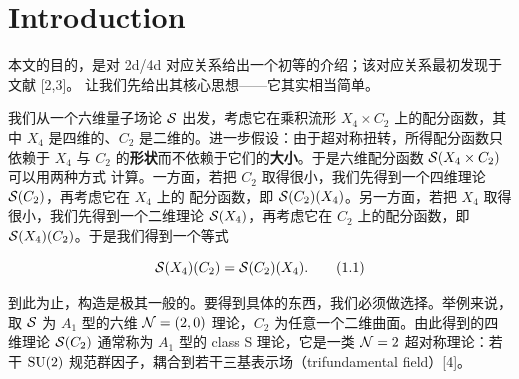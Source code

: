 
\section{Introduction}

本文的目的，是对 2d/4d 对应关系给出一个初等的介绍；该对应关系最初发现于文献 [2,3]。
让我们先给出其核心思想——它其实相当简单。


我们从一个六维量子场论 $\mathcal{S}$ 出发，考虑它在乘积流形 $X_4\times C_2$ 上的配分函数，其中
$X_4$ 是四维的、$C_2$ 是二维的。进一步假设：由于超对称扭转，所得配分函数只依赖于 $X_4$ 与
$C_2$ 的\textbf{形状}而不依赖于它们的\textbf{大小}。于是六维配分函数 $\mathcal{S}(X_4\times C_2)$ 可以用两种方式
计算。一方面，若把 $C_2$ 取得很小，我们先得到一个四维理论 $\mathcal{S}(C_2)$，再考虑它在 $X_4$ 上的
配分函数，即 $\mathcal{S}(C_2)(X_4)$。另一方面，若把 $X_4$ 取得很小，我们先得到一个二维理论
$\mathcal{S}(X_4)$，再考虑它在 $C_2$ 上的配分函数，即 $\mathcal{S}(X_4)(C_2)$。于是我们得到一个等式

\begin{equation}
  \mathcal{S}(X_4)(C_2) = \mathcal{S}(C_2)(X_4). \tag{1.1}
\end{equation}


到此为止，构造是极其一般的。要得到具体的东西，我们必须做选择。举例来说，取 $\mathcal{S}$ 为
$A_1$ 型的六维 $\mathcal{N}=(2,0)$ 理论，$C_2$ 为任意一个二维曲面。由此得到的四维理论
$\mathcal{S}(C_2)$ 通常称为 $A_1$ 型的 class S 理论，它是一类 $\mathcal{N}=2$ 超对称理论：若干 $\mathrm{SU}(2)$
规范群因子，耦合到若干三基表示场（trifundamental field）[4]。


